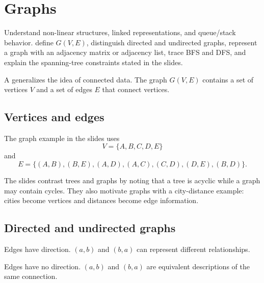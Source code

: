 \chapter{Graphs}\label{ch:graphs}

\chapterguide%
  {Understand non-linear structures, linked representations, and queue/stack behavior.}
  {define $G(V,E)$, distinguish directed and undirected graphs, represent a graph with an adjacency matrix or adjacency list, trace BFS and DFS, and explain the spanning-tree constraints stated in the slides.}

A  generalizes the idea of connected data. The graph $G(V,E)$ contains a set of vertices $V$ and a set of edges $E$ that connect vertices.

\section{Vertices and edges}

The graph example in the slides uses
\[
V=\{A,B,C,D,E\}
\]
and
\[
E=\{(A,B),(B,E),(A,D),(A,C),(C,D),(D,E),(B,D)\}.
\]

\begin{mlfigure}
\end{mlfigure}

The slides contrast trees and graphs by noting that a tree is acyclic while a graph may contain cycles. They also motivate graphs with a city-distance example: cities become vertices and distances become edge information.

\section{Directed and undirected graphs}

\begin{description}[leftmargin=1.4in,style=nextline]
  \item[Directed graph] Edges have direction. $(a,b)$ and $(b,a)$ can represent different relationships.
  \item[Undirected graph] Edges have no direction. $(a,b)$ and $(b,a)$ are equivalent descriptions of the same connection.
\end{description}

